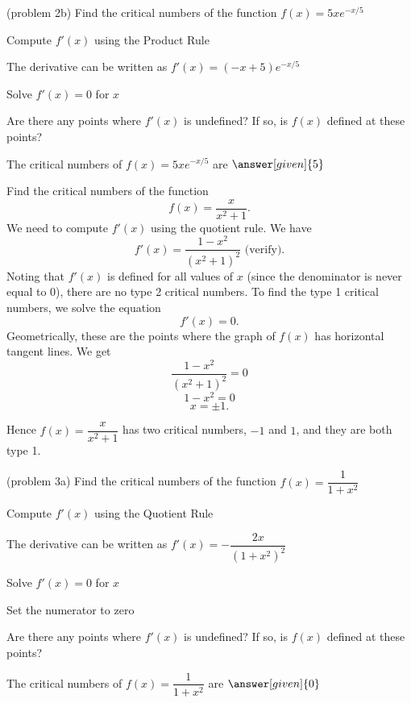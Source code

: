 \documentclass{ximera}
\begin{document}
\begin{problem}(problem 2b)
  Find the critical numbers of the function $f(x) = 5xe^{-x/5}$
  
  
    \begin{hint}
      Compute $f'(x)$ using the Product Rule
    \end{hint}
    \begin{hint}
      The derivative can be written as $f'(x) = (-x + 5)e^{-x/5}$
    \end{hint}
		\begin{hint}
      Solve $f'(x) = 0$ for $x$
    \end{hint}
    \begin{hint}
      Are there any points where $f'(x)$ is undefined?
      If so, is $f(x)$ defined at these points?  
		\end{hint}
    
    
		The critical numbers of $f(x) = 5xe^{-x/5}$ are
		 $\answer[given]{5}$
		
\end{problem}




\begin{example}[example 3] Find the critical numbers of the function 
\[f(x) = \dfrac{x}{x^2 +1}.\]
We need to compute $f'(x)$ using the quotient rule.  We have
\[f'(x) = \frac{1-x^2}{(x^2+1)^2} \mbox{   (verify)}.\]
Noting that $f'(x)$ is defined for all values of $x$ (since the denominator is never equal to 0), 
there are no type 2 critical numbers.
To find the type 1 critical numbers, we solve the equation
\[f'(x) = 0.\]
Geometrically, these are the points where the graph of $f(x)$ has horizontal tangent lines.
We get
\[ \frac{1-x^2}{(x^2+1)^2} =0\]
\[ 1-x^2 =0\]
\[x = \pm 1.\]

Hence $f(x) = \dfrac{x}{x^2 +1}$ has two critical numbers, $-1$ and $1$, and they are both type 1. 
\end{example}

\begin{problem}(problem 3a)
  Find the critical numbers of the function $f(x) = \dfrac{1}{1 + x^2}$
  
  
    \begin{hint}
      Compute $f'(x)$ using the Quotient Rule
    \end{hint}
    \begin{hint}
      The derivative can be written as $f'(x) = -\dfrac{2x}{(1 + x^2)^2}$
    \end{hint}
		\begin{hint}
      Solve $f'(x) = 0$ for $x$
    \end{hint}
		\begin{hint}
      Set the numerator to zero
    \end{hint}
    \begin{hint}
      Are there any points where $f'(x)$ is undefined?
      If so, is $f(x)$ defined at these points?  
		\end{hint}
    
    
		The critical numbers of $f(x) = \dfrac{1}{1 + x^2}$ are
		 $\answer[given]{0}$
		
\end{problem}
\end{document}
